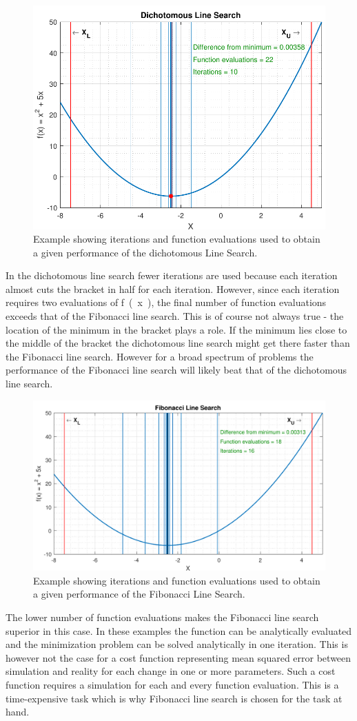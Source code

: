 \begin{figure}[H] 
	\centering
	\includegraphics[width=.65\textwidth]{figures/dichotomousLineSearchPerformance}
	\caption{Example showing iterations and function evaluations used to obtain a given performance of the dichotomous Line Search.}
	\label{dichotomousLineSearchPerformance}
\end{figure}

In the dichotomous line search fewer iterations are used because each iteration almost cuts the bracket in half for each iteration. However, since each iteration requires two evaluations of \si{f(x)}, the final number of function evaluations exceeds that of the Fibonacci line search. This is of course not always true - the location of the minimum in the bracket plays a role. If the minimum lies close to the middle of the bracket the dichotomous line search might get there faster than the Fibonacci line search. However for a broad spectrum of problems the performance of the Fibonacci line search will likely beat that of the dichotomous line search.

\begin{figure}[H] 
	\centering
	\includegraphics[width=.65\textwidth]{figures/fibonacciLineSearchPerformance}
	\caption{Example showing iterations and function evaluations used to obtain a given performance of the Fibonacci Line Search.}
	\label{fibonacciLineSearchPerformance}
\end{figure}

The lower number of function evaluations makes the Fibonacci line search superior in this case. In these examples the function can be analytically evaluated and the minimization problem can be solved analytically in one iteration. This is however not the case for a cost function representing mean squared error between simulation and reality for each change in one or more parameters. Such a cost function requires a simulation for each and every function evaluation. This is a time-expensive task which is why Fibonacci line search is chosen for the task at hand.